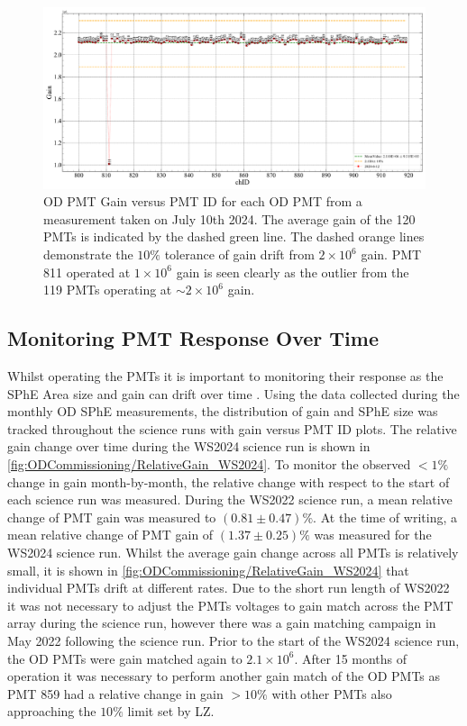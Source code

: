 \begin{figure}[ht!]
    \centering
    \includegraphics[width=\textwidth]{figures/ODCommissioning/2024-6-12_ODPMT_Gain.pdf}
    \caption{OD PMT Gain versus PMT ID for each OD PMT from a measurement taken on July 10th 2024. The average gain of the 120 PMTs is indicated by the dashed green line. The dashed orange lines demonstrate the $10\%$ tolerance of gain drift from $2\times10^6$ gain. PMT 811 operated at $1\times10^6$ gain is seen clearly as the outlier from the 119 PMTs operating at $\sim2\times10^6$ gain.}
    \label{fig:ODCommissioning/ODPMTGain_2024-7-10}
\end{figure}

\subsection{Monitoring PMT Response Over Time}
Whilst operating the PMTs it is important to monitoring their response as the SPhE Area size and gain can drift over time \cite{DayaBay:2016ggj,Super-Kamiokande:2023jbt}. Using the data collected during the monthly OD SPhE measurements, the distribution of gain and SPhE size was tracked throughout the science runs with gain versus PMT ID plots. The relative gain change over time during the WS2024 science run is shown in \autoref{fig:ODCommissioning/RelativeGain_WS2024}.
To monitor the observed $<1\%$ change in gain month-by-month, the relative change with respect to the start of each science run was measured. During the WS2022 science run, a mean relative change of PMT gain was measured to $(0.81\pm0.47)\%$. At the time of writing, a mean relative change of PMT gain of $(1.37\pm0.25)\%$ was measured for the WS2024 science run. Whilst the average gain change across all PMTs is relatively small, it is shown in \autoref{fig:ODCommissioning/RelativeGain_WS2024} that individual PMTs drift at different rates. Due to the short run length of WS2022 it was not necessary to adjust the PMTs voltages to gain match across the PMT array during the science run, however there was a gain matching campaign in May 2022 following the science run. Prior to the start of the WS2024 science run, the OD PMTs were gain matched again to $2.1\times10^{6}$. After 15 months of operation it was necessary to perform another gain match of the OD PMTs as PMT 859 had a relative change in gain $>10\%$ with other PMTs also approaching the $10\%$ limit set by LZ.

